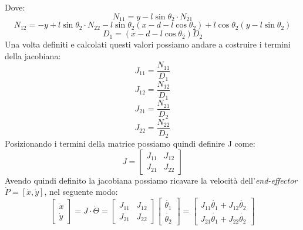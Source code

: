 Dove:
\begin{equation*}
	N_{11} = y-l\sin\theta_2 \cdot N_{21}
\end{equation*}
\begin{equation*}
	N_{12} = -y+l\sin\theta_2 \cdot N_{22} -l\sin\theta_2(x-d-l\cos\theta_2) + l\cos\theta_2(y-l\sin\theta_2)
\end{equation*}
\begin{equation*}
	D_1 = (x-d-l\cos\theta_2)D_2
\end{equation*}
Una volta definiti e calcolati questi valori possiamo andare a costruire i termini della jacobiana:   
\begin{equation*}
    J_{11} = \frac{N_{11}}{D_1}
\end{equation*}
\begin{equation*}
    J_{12} = \frac{N_{12}}{D_1}
\end{equation*}
\begin{equation*}
    J_{21} = \frac{N_{21}}{D_2}
\end{equation*}
\begin{equation*}
    J_{22} = \frac{N_{22}}{D_2}
\end{equation*}
Posizionando i termini della matrice possiamo quindi definire J come:
\begin{equation}
    J = \begin{bmatrix}
    J_{11} & J_{12} \\ J_{21} & J_{22}
    \end{bmatrix}
    \label{eq:J12}
\end{equation}
Avendo quindi definito la jacobiana possiamo ricavare la velocità dell'\textit{end-effector}  $\dot{P} = [\dot{x},\dot{y}]$, nel seguente modo:
\begin{equation}
	\begin{bmatrix}
		\dot{x} \\ \dot{y}
 	\end{bmatrix} = J \cdot \dot{\Theta} =\begin{bmatrix}
 	J_{11} & J_{12} \\ J_{21} & J_{22}
 \end{bmatrix}
 	\begin{bmatrix}
 		\dot{\theta_1} \\ \dot{\theta_2}
 	\end{bmatrix} = 
 \begin{bmatrix}
 	J_{11}\dot{\theta_1} + J_{12}\dot{\theta_2} \\
 	J_{21}\dot{\theta_1} + J_{22}\dot{\theta_2}
 \end{bmatrix}
\end{equation}
